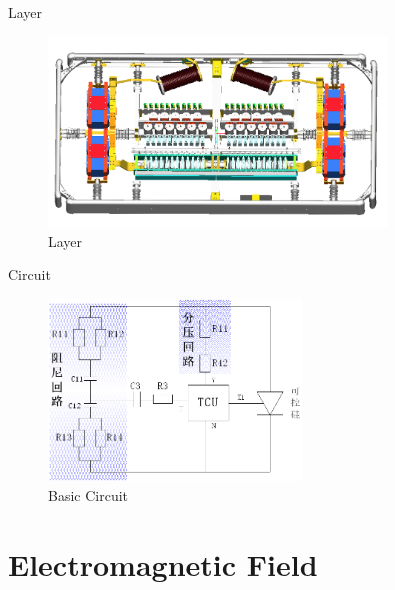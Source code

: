 \documentclass{beamer}
\begin{document}
\begin{frame}{Layer}
  \begin{figure}
    \centering
    \includegraphics[width=0.8\textwidth]{figures/layer}
    \caption{Layer}
  \end{figure}
\end{frame}

\begin{frame}{Circuit}
  \begin{figure}
    \centering
    \includegraphics[width=0.6\textwidth]{figures/circuit}
    \caption{Basic Circuit}
  \end{figure}
\end{frame}

\section{Electromagnetic Field}
\end{document}
